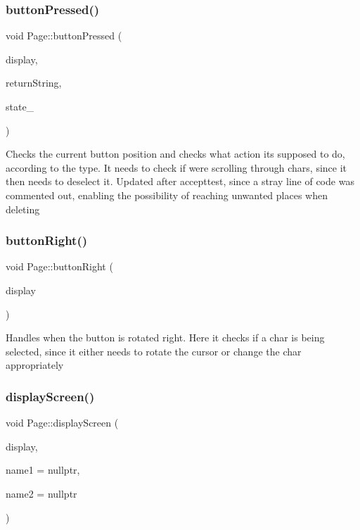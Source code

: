 \subsubsection{\texorpdfstring{button\+Pressed()}{buttonPressed()}}
{\footnotesize\ttfamily void Page\+::button\+Pressed (\begin{DoxyParamCaption}\item[{\hyperlink{class_l_c_d}{L\+CD} $\ast$}]{display,  }\item[{string \&}]{return\+String,  }\item[{unsigned int \&}]{state\+\_\+ }\end{DoxyParamCaption})\hspace{0.3cm}{\ttfamily [inline]}}

Checks the current button position and checks what action it\textquotesingle{}s supposed to do, according to the type. It needs to check if we\textquotesingle{}re scrolling through chars, since it then needs to deselect it. Updated after accepttest, since a stray line of code was commented out, enabling the possibility of reaching unwanted places when deleting \mbox{\label{class_page_aea5c5dd94cfbb77072150c60a59b6589}} 
\subsubsection{\texorpdfstring{button\+Right()}{buttonRight()}}
{\footnotesize\ttfamily void Page\+::button\+Right (\begin{DoxyParamCaption}\item[{\hyperlink{class_l_c_d}{L\+CD} $\ast$}]{display }\end{DoxyParamCaption})\hspace{0.3cm}{\ttfamily [inline]}}

Handles when the button is rotated right. Here it checks if a char is being selected, since it either needs to rotate the cursor or change the char appropriately \mbox{\label{class_page_ae49da6fc746a1c10c4d208d717b6da31}} 
\subsubsection{\texorpdfstring{display\+Screen()}{displayScreen()}}
{\footnotesize\ttfamily void Page\+::display\+Screen (\begin{DoxyParamCaption}\item[{\hyperlink{class_l_c_d}{L\+CD} $\ast$}]{display,  }\item[{string $\ast$}]{name1 = {\ttfamily nullptr},  }\item[{string $\ast$}]{name2 = {\ttfamily nullptr} }\end{DoxyParamCaption})\hspace{0.3cm}{\ttfamily [inline]}}

